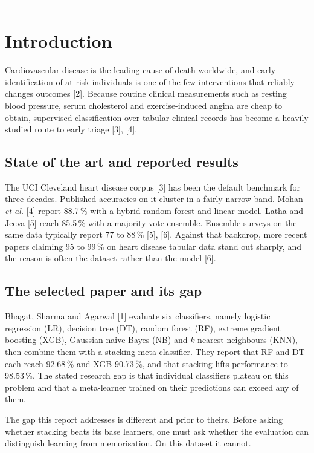 \documentclass[11pt,a4paper]{article}
\newenvironment{keypoint}{\begin{leftbar}\small}{\end{leftbar}}
\begin{document}
\rule{\textwidth}{0.4pt}




\section{Introduction}

Cardiovascular disease is the leading cause of death worldwide, and early
identification of at-risk individuals is one of the few interventions that
reliably changes outcomes [2]. Because routine clinical measurements
such as resting blood pressure, serum cholesterol and exercise-induced angina are
cheap to obtain, supervised classification over tabular clinical records has
become a heavily studied route to early triage [3], [4].

\subsection{State of the art and reported results}
The UCI Cleveland heart disease corpus [3] has been the default
benchmark for three decades. Published accuracies on it cluster in a fairly
narrow band. Mohan \emph{et al.} [4] report 88.7\,\% with a hybrid
random forest and linear model. Latha and Jeeva [5] reach 85.5\,\%
with a majority-vote ensemble. Ensemble surveys on the same data typically
report 77 to 88\,\% [5], [6]. Against that backdrop, more
recent papers claiming 95 to 99\,\% on heart disease tabular data stand out
sharply, and the reason is often the dataset rather than the model
[6].

\subsection{The selected paper and its gap}
Bhagat, Sharma and Agarwal [1] evaluate six classifiers, namely
logistic regression (LR), decision tree (DT), random forest (RF), extreme
gradient boosting (XGB), Gaussian naive Bayes (NB) and $k$-nearest neighbours
(KNN), then combine them with a stacking meta-classifier. They report that RF and
DT each reach 92.68\,\% and XGB 90.73\,\%, and that stacking lifts performance to
98.53\,\%. The stated research gap is that individual classifiers plateau on this
problem and that a meta-learner trained on their predictions can exceed any of
them.

\begin{keypoint}
The gap this report addresses is different and prior to theirs. Before asking
whether stacking beats its base learners, one must ask whether the evaluation can
distinguish learning from memorisation. On this dataset it cannot.
\end{keypoint}
\end{document}
